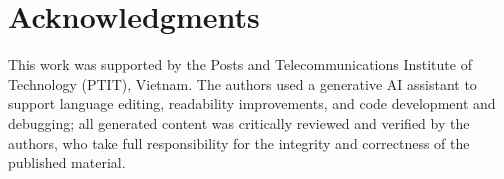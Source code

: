 \documentclass[conference]{IEEEtran}
\begin{document}
\section*{Acknowledgments}
This work was supported by the Posts and Telecommunications Institute of
Technology (PTIT), Vietnam. The authors used a generative AI assistant
to support language editing, readability improvements, and code
development and debugging; all generated content was critically
reviewed and verified by the authors, who take full responsibility for
the integrity and correctness of the published material.



\end{document}
